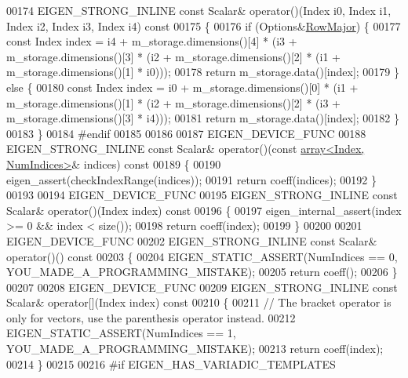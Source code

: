 \begin{DoxyCode}
00174     EIGEN\_STRONG\_INLINE \textcolor{keyword}{const} Scalar& operator()(Index i0, Index i1, Index i2, Index i3, Index i4)\textcolor{keyword}{ const}
00175 \textcolor{keyword}{    }\{
00176       \textcolor{keywordflow}{if} (Options&\hyperlink{group__enums_ggaacded1a18ae58b0f554751f6cdf9eb13acfcde9cd8677c5f7caf6bd603666aae3}{RowMajor}) \{
00177         \textcolor{keyword}{const} Index index = i4 + m\_storage.dimensions()[4] * (i3 + m\_storage.dimensions()[3] * (i2 + 
      m\_storage.dimensions()[2] * (i1 + m\_storage.dimensions()[1] * i0)));
00178         \textcolor{keywordflow}{return} m\_storage.data()[index];
00179       \} \textcolor{keywordflow}{else} \{
00180         \textcolor{keyword}{const} Index index = i0 + m\_storage.dimensions()[0] * (i1 + m\_storage.dimensions()[1] * (i2 + 
      m\_storage.dimensions()[2] * (i3 + m\_storage.dimensions()[3] * i4)));
00181         \textcolor{keywordflow}{return} m\_storage.data()[index];
00182       \}
00183     \}
00184 \textcolor{preprocessor}{#endif}
00185 
00186 
00187     EIGEN\_DEVICE\_FUNC
00188     EIGEN\_STRONG\_INLINE \textcolor{keyword}{const} Scalar& operator()(\textcolor{keyword}{const} \hyperlink{class_eigen_1_1array}{array<Index, NumIndices>}& 
      indices)\textcolor{keyword}{ const}
00189 \textcolor{keyword}{    }\{
00190       eigen\_assert(checkIndexRange(indices));
00191       \textcolor{keywordflow}{return} coeff(indices);
00192     \}
00193 
00194     EIGEN\_DEVICE\_FUNC
00195     EIGEN\_STRONG\_INLINE \textcolor{keyword}{const} Scalar& operator()(Index index)\textcolor{keyword}{ const}
00196 \textcolor{keyword}{    }\{
00197       eigen\_internal\_assert(index >= 0 && index < size());
00198       \textcolor{keywordflow}{return} coeff(index);
00199     \}
00200 
00201     EIGEN\_DEVICE\_FUNC
00202     EIGEN\_STRONG\_INLINE \textcolor{keyword}{const} Scalar& operator()()\textcolor{keyword}{ const}
00203 \textcolor{keyword}{    }\{
00204       EIGEN\_STATIC\_ASSERT(NumIndices == 0, YOU\_MADE\_A\_PROGRAMMING\_MISTAKE);
00205       \textcolor{keywordflow}{return} coeff();
00206     \}
00207 
00208     EIGEN\_DEVICE\_FUNC
00209     EIGEN\_STRONG\_INLINE \textcolor{keyword}{const} Scalar& operator[](Index index)\textcolor{keyword}{ const}
00210 \textcolor{keyword}{    }\{
00211       \textcolor{comment}{// The bracket operator is only for vectors, use the parenthesis operator instead.}
00212       EIGEN\_STATIC\_ASSERT(NumIndices == 1, YOU\_MADE\_A\_PROGRAMMING\_MISTAKE);
00213       \textcolor{keywordflow}{return} coeff(index);
00214     \}
00215 
00216 \textcolor{preprocessor}{#if EIGEN\_HAS\_VARIADIC\_TEMPLATES}

\end{DoxyCode}
